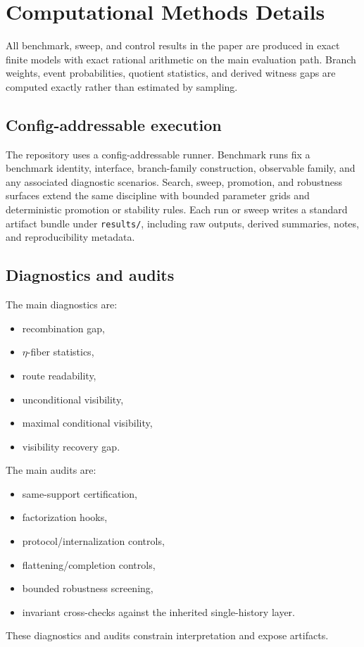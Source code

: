 \documentclass[11pt]{article}
\theoremstyle{definition}
\begin{document}
 \section{Computational Methods Details}

All benchmark, sweep, and control results in the paper are produced in exact finite models with exact rational arithmetic on the main evaluation path. Branch weights, event probabilities, quotient statistics, and derived witness gaps are computed exactly rather than estimated by sampling.

\subsection{Config-addressable execution}

The repository uses a config-addressable runner. Benchmark runs fix a benchmark identity, interface, branch-family construction, observable family, and any associated diagnostic scenarios. Search, sweep, promotion, and robustness surfaces extend the same discipline with bounded parameter grids and deterministic promotion or stability rules. Each run or sweep writes a standard artifact bundle under \texttt{results/}, including raw outputs, derived summaries, notes, and reproducibility metadata.

\subsection{Diagnostics and audits}

The main diagnostics are:
\begin{itemize}
\item recombination gap,
\item \(\eta\)-fiber statistics,
\item route readability,
\item unconditional visibility,
\item maximal conditional visibility,
\item visibility recovery gap.
\end{itemize}
The main audits are:
\begin{itemize}
\item same-support certification,
\item factorization hooks,
\item protocol/internalization controls,
\item flattening/completion controls,
\item bounded robustness screening,
\item invariant cross-checks against the inherited single-history layer.
\end{itemize}
These diagnostics and audits constrain interpretation and expose artifacts.
\end{document}
